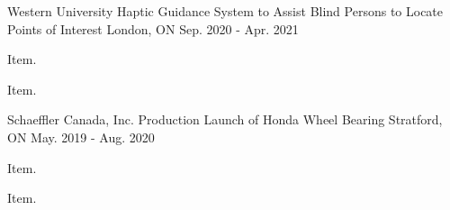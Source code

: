 

\begin{cventries}

  \cventry
    {Western University} %
    {Haptic Guidance System to Assist Blind Persons to Locate Points of Interest} %
    {London, ON} %
    {Sep. 2020 - Apr. 2021} %
    {
      \begin{cvitems} %
        \item {Item.}
        \item {Item.}
      \end{cvitems}
    }

\cventry
{Schaeffler Canada, Inc.} %
{Production Launch of Honda Wheel Bearing } %
{Stratford, ON} %
{May. 2019 - Aug. 2020} %
{
  \begin{cvitems} %
    \item {Item.}
    \item {Item.}
  \end{cvitems}
}

\end{cventries}

